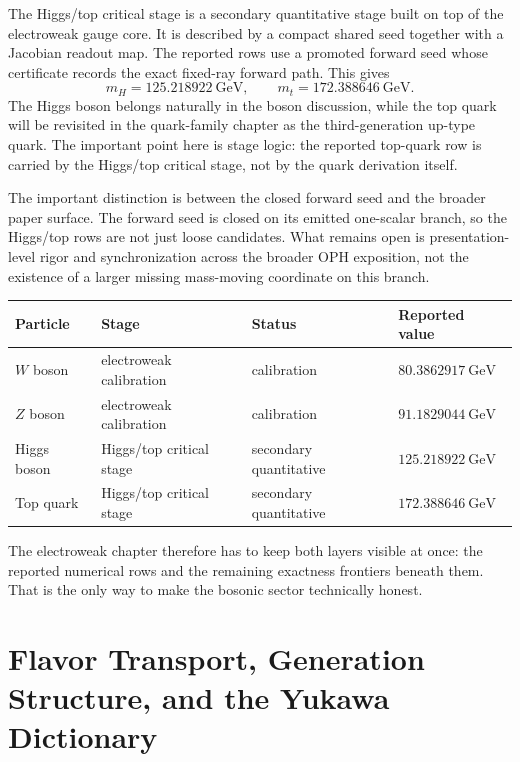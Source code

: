 \documentclass[11pt]{article}
\begin{document}
The Higgs/top critical stage is a secondary quantitative stage built on top of the electroweak gauge core.
It is described by a compact shared seed together with a Jacobian readout map. The reported
rows use a promoted forward seed whose certificate records the exact fixed-ray forward
path. This gives
\[
m_H = 125.218922~\mathrm{GeV},
\qquad
m_t = 172.388646~\mathrm{GeV}.
\]
The Higgs boson belongs naturally in the boson discussion, while the top quark will be revisited
in the quark-family chapter as the third-generation up-type quark. The important point here is
stage logic: the reported top-quark row is carried by the Higgs/top critical stage, not by the quark derivation itself.

The important distinction is between the closed forward seed and the broader paper surface. The
forward seed is closed on its emitted one-scalar branch, so the Higgs/top rows are
not just loose candidates. What remains open is presentation-level rigor and synchronization
across the broader OPH exposition, not the existence of a larger missing mass-moving
coordinate on this branch.

\begin{table}[h]
\centering
\small
\begin{tabular}{@{}llll@{}}
\toprule
Particle & Stage & Status & Reported value \\
\midrule
\(W\) boson & electroweak calibration & calibration & \(80.3862917~\mathrm{GeV}\) \\
\(Z\) boson & electroweak calibration & calibration & \(91.1829044~\mathrm{GeV}\) \\
Higgs boson & Higgs/top critical stage & secondary quantitative & \(125.218922~\mathrm{GeV}\) \\
Top quark & Higgs/top critical stage & secondary quantitative & \(172.388646~\mathrm{GeV}\) \\
\bottomrule
\end{tabular}
\end{table}

The electroweak chapter therefore has to keep both layers visible at once:
the reported numerical rows and the remaining exactness frontiers beneath them. That is the only
way to make the bosonic sector technically honest.

\section{Flavor Transport, Generation Structure, and the Yukawa Dictionary}
\end{document}
